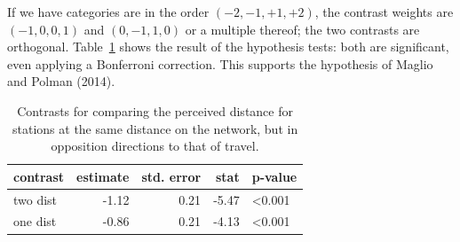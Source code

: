 \documentclass[
  11pt,
  letterpaper,
]{scrbook}
\theoremstyle{definition}
\theoremstyle{definition}
\theoremstyle{remark}
\begin{document}
If we have categories are in the order \((-2, -1, +1, +2)\), the
contrast weights are \((-1, 0, 0, 1)\) and \((0, -1, 1, 0)\) or a
multiple thereof; the two contrasts are orthogonal.
Table~\ref{tbl-contrast-MP14} shows the result of the hypothesis tests:
both are significant, even applying a Bonferroni correction. This
supports the hypothesis of Maglio and Polman (2014).

\begin{longtable}[]{@{}lrrrl@{}}

\caption{\label{tbl-contrast-MP14}Contrasts for comparing the perceived
distance for stations at the same distance on the network, but in
opposition directions to that of travel.}

\tabularnewline

\toprule\noalign{}
contrast & estimate & std. error & stat & p-value \\
\midrule\noalign{}
\endhead
\bottomrule\noalign{}
\endlastfoot
two dist & -1.12 & 0.21 & -5.47 & \textless0.001 \\
one dist & -0.86 & 0.21 & -4.13 & \textless0.001 \\

\end{longtable}
\end{document}
